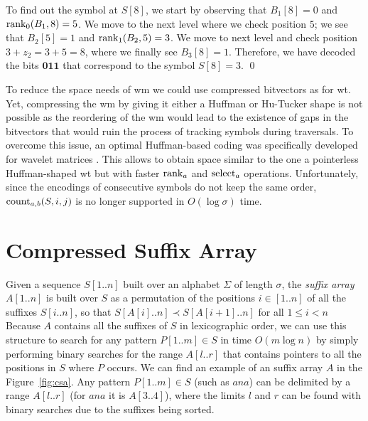 \documentclass[a4paper,10pt,twoside]{book}
\begin{document}
    \begin{example}
    To find out the symbol at $S[8]$, we start by observing that $B_1[8]=0$ and $\operatorname{rank}_0(B_1,8)=5$. We move to the next level where we check position $5$; we see that $B_2[5]=1$ and $\operatorname{rank}_1(B_2,5)=3$. We move to next level and check position $3+z_2 = 3+5 = 8$,
    where we finally see $B_3[8]=1$. Therefore, we have decoded the bits $\mathbf{011}$ that correspond to the symbol $S[8] = 3$.
    \qed
    \end{example}
    
    To reduce the space needs of \gls{wm} we could use compressed bitvectors as for \gls{wt}. Yet, 
    compressing the \gls{wm} by giving it either a Huffman or Hu-Tucker shape is not possible as the reordering of the \gls{wm} would lead to the existence of %
    gaps in the bitvectors 
    that would ruin the process of 
    tracking symbols during traversals. To overcome this issue, an optimal Huffman-based coding was 
    specifically developed for wavelet matrices \cite{CNO15, Farina2016}. This allows to obtain space
    similar to the one a pointerless Huffman-shaped \gls{wt} but with faster $\operatorname{rank}_a$ and $\operatorname{select}_a$ operations.
    Unfortunately, since the encodings of consecutive symbols do not keep the same order, $\operatorname{count}_{a,b}(S,i,j)$ is no longer supported in $O(\log\sigma)$ time.
	
	\section{Compressed Suffix Array}
	\label{sec:csa}
	Given a sequence $S[1..n]$ built over an alphabet $\Sigma$ of length
    $\sigma$, the {\em suffix array} $A[1..n]$ is built over $S$ \cite{MM93}
    as a permutation of the positions $i \in [1..n]$ of all the suffixes $S[i..n]$, so that
    $S[A[i]..n] \prec S[A[i+1]..n]$ for all $1 \le i < n$
    Because $A$ contains all the suffixes of $S$ in lexicographic order,
    we can use this structure to search for any pattern $P[1..m] \in S$ in time
    $O(m \log n)$ by simply performing binary searches for the range $A[l..r]$ that
    contains pointers to all the positions in $S$ where $P$ occurs.
    We can find an example of an suffix array $A$ in the Figure~\ref{fig:csa}. Any pattern $P[1..m] \in S$ (such as $ana$) can be delimited by a range $A[l..r]$ (for $ana$ it is $A[3..4]$), where the limits $l$ and $r$ can be found with binary searches due to the suffixes being sorted.
    
\end{document}
